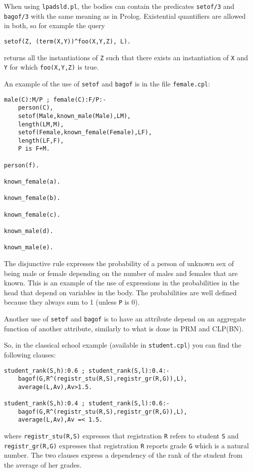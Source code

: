 \documentclass[a4paper,12pt]{article}
\begin{document}
When using \texttt{lpadsld.pl}, the bodies can contain the predicates \texttt{setof/3} and \texttt{bagof/3} with the same meaning as in Prolog. Existential quantifiers are allowed in both, so for example the query
\begin{verbatim}
setof(Z, (term(X,Y))^foo(X,Y,Z), L).
\end{verbatim}
returns all the instantiations of \texttt{Z} such that there exists an instantiation of \texttt{X} and \texttt{Y} for which \texttt{foo(X,Y,Z)} is true.

An example of the use of \texttt{setof} and \texttt{bagof} is in the file \texttt{female.cpl}:
\begin{verbatim}
male(C):M/P ; female(C):F/P:-
    person(C),
    setof(Male,known_male(Male),LM),
    length(LM,M),
    setof(Female,known_female(Female),LF),
    length(LF,F),
    P is F+M.

person(f).

known_female(a).

known_female(b).

known_female(c).

known_male(d).

known_male(e).
\end{verbatim}
The disjunctive rule expresses the probability of a person of unknown sex of being male or female depending on the number of males and females that are known.
This is an example of the use of expressions in the probabilities in the head that depend on variables in the body. The probabilities are well defined because they always sum to 1 (unless \texttt{P} is 0).

Another use of \texttt{setof} and \texttt{bagof} is to have an attribute depend on an aggregate function of another attribute, similarly to what is done in PRM and CLP(BN).

So, in the classical school example (available in \texttt{student.cpl}) you can find the following
clauses:
\begin{verbatim}
student_rank(S,h):0.6 ; student_rank(S,l):0.4:- 
    bagof(G,R^(registr_stu(R,S),registr_gr(R,G)),L),
    average(L,Av),Av>1.5.

student_rank(S,h):0.4 ; student_rank(S,l):0.6:- 
    bagof(G,R^(registr_stu(R,S),registr_gr(R,G)),L),
    average(L,Av),Av =< 1.5.
\end{verbatim}
where \verb|registr_stu(R,S)| expresses that registration \texttt{R} refers to student \texttt{S} and \verb|registr_gr(R,G)| expresses that registration \texttt{R} reports  grade \texttt{G} which is a natural number. The two clauses express a dependency of the rank of the student from the average of her grades.
\end{document}
